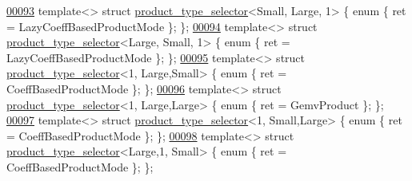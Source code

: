 \begin{DoxyCode}
\hyperlink{struct_eigen_1_1internal_1_1product__type__selector_3_01_small_00_01_large_00_011_01_4}{00093} \textcolor{keyword}{template}<>              \textcolor{keyword}{struct }\hyperlink{struct_eigen_1_1internal_1_1product__type__selector}{product\_type\_selector}<Small, Large, 1>    \{ \textcolor{keyword}{enum} \{ ret 
      = LazyCoeffBasedProductMode \}; \};
\hyperlink{struct_eigen_1_1internal_1_1product__type__selector_3_01_large_00_01_small_00_011_01_4}{00094} \textcolor{keyword}{template}<>              \textcolor{keyword}{struct }\hyperlink{struct_eigen_1_1internal_1_1product__type__selector}{product\_type\_selector}<Large, Small, 1>    \{ \textcolor{keyword}{enum} \{ ret 
      = LazyCoeffBasedProductMode \}; \};
\hyperlink{struct_eigen_1_1internal_1_1product__type__selector_3_011_00_01_large_00_01_small_01_4}{00095} \textcolor{keyword}{template}<>              \textcolor{keyword}{struct }\hyperlink{struct_eigen_1_1internal_1_1product__type__selector}{product\_type\_selector}<1,    Large,Small>  \{ \textcolor{keyword}{enum} \{ ret 
      = CoeffBasedProductMode \}; \};
\hyperlink{struct_eigen_1_1internal_1_1product__type__selector_3_011_00_01_large_00_01_large_01_4}{00096} \textcolor{keyword}{template}<>              \textcolor{keyword}{struct }\hyperlink{struct_eigen_1_1internal_1_1product__type__selector}{product\_type\_selector}<1,    Large,Large>  \{ \textcolor{keyword}{enum} \{ ret 
      = GemvProduct \}; \};
\hyperlink{struct_eigen_1_1internal_1_1product__type__selector_3_011_00_01_small_00_01_large_01_4}{00097} \textcolor{keyword}{template}<>              \textcolor{keyword}{struct }\hyperlink{struct_eigen_1_1internal_1_1product__type__selector}{product\_type\_selector}<1,    Small,Large>  \{ \textcolor{keyword}{enum} \{ ret 
      = CoeffBasedProductMode \}; \};
\hyperlink{struct_eigen_1_1internal_1_1product__type__selector_3_01_large_00_011_00_01_small_01_4}{00098} \textcolor{keyword}{template}<>              \textcolor{keyword}{struct }\hyperlink{struct_eigen_1_1internal_1_1product__type__selector}{product\_type\_selector}<Large,1,    Small>  \{ \textcolor{keyword}{enum} \{ ret 
      = CoeffBasedProductMode \}; \};

\end{DoxyCode}
